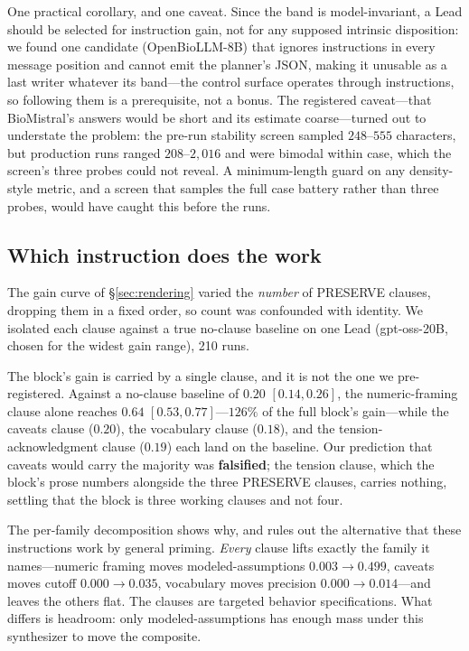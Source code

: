 \documentclass[11pt]{article}
\begin{document}
One practical corollary, and one caveat. Since the band is model-invariant,
a Lead should be selected for instruction gain, not for any supposed
intrinsic disposition: we found one candidate (OpenBioLLM-8B) that
ignores instructions in every message position and cannot emit the planner's
JSON, making it unusable as a last writer whatever its band---the control
surface operates through instructions, so following them is a prerequisite,
not a bonus. The registered caveat---that BioMistral's answers would be short and its
estimate coarse---turned out to understate the problem: the pre-run stability
screen sampled $248$--$555$ characters, but production runs ranged
$208$--$2{,}016$ and were bimodal within case, which the screen's three probes
could not reveal. A minimum-length guard on any density-style metric, and a
screen that samples the full case battery rather than three probes, would
have caught this before the runs.

\subsection{Which instruction does the work}
\label{sec:clause}
The gain curve of \S\ref{sec:rendering} varied the \emph{number} of PRESERVE
clauses, dropping them in a fixed order, so count was confounded with
identity. We isolated each clause against a true no-clause baseline on one
Lead (gpt-oss-20B, chosen for the widest gain range), 210 runs.

The block's gain is carried by a single clause, and it is not the one we
pre-registered. Against a no-clause baseline of $0.20$ $[0.14,0.26]$, the
numeric-framing clause alone reaches $0.64$ $[0.53,0.77]$---$126\%$ of the
full block's gain---while the caveats clause ($0.20$), the vocabulary clause
($0.18$), and the tension-acknowledgment clause ($0.19$) each land on the
baseline. Our prediction that caveats would carry the majority was
\textbf{falsified}; the tension clause, which the block's prose numbers
alongside the three PRESERVE clauses, carries nothing, settling that the
block is three working clauses and not four.

The per-family decomposition shows why, and rules out the alternative that
these instructions work by general priming. \emph{Every} clause lifts
exactly the family it names---numeric framing moves modeled-assumptions
$0.003 \rightarrow 0.499$, caveats moves cutoff $0.000 \rightarrow 0.035$,
vocabulary moves precision $0.000 \rightarrow 0.014$---and leaves the others
flat. The clauses are targeted behavior specifications. What differs is
headroom: only modeled-assumptions has enough mass under this synthesizer to
move the composite.
\end{document}
